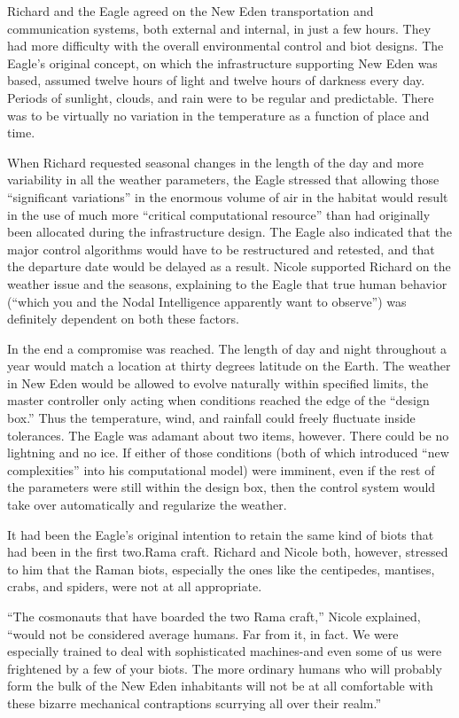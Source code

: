 \documentclass[]{article}
\begin{document}
{Richard and the Eagle agreed on the New Eden transportation and communication systems, both external and internal, in just a few hours. They had more difficulty with the overall environmental control and biot designs. The Eagle’s original concept, on which the infrastructure supporting New Eden was based, assumed twelve hours of light and twelve hours of darkness every day. Periods of sunlight, clouds, and rain were to be regular and predictable. There was to be virtually no variation in the temperature as a function of place and time.

When Richard requested seasonal changes in the length of the day and more variability in all the weather parameters, the Eagle stressed that allowing those “significant variations” in the enormous volume of air in the habitat would result in the use of much more “critical computational resource” than had originally been allocated during the infrastructure design. The Eagle also indicated that the major control algorithms would have to be restructured and retested, and that the departure date would be delayed as a result. Nicole supported Richard on the weather issue and the seasons, explaining to the Eagle that true human behavior (“which you and the Nodal Intelligence apparently want to observe”) was definitely dependent on both these factors.

In the end a compromise was reached. The length of day and night throughout a year would match a location at thirty degrees latitude on the Earth. The weather in New Eden would be allowed to evolve naturally within specified limits, the master controller only acting when conditions reached the edge of the “design box.” Thus the temperature, wind, and rainfall could freely fluctuate inside tolerances. The Eagle was adamant about two items, however. There could be no lightning and no ice. If either of those conditions (both of which introduced “new complexities” into his computational model) were imminent, even if the rest of the parameters were still within the design box, then the control system would take over automatically and regularize the weather.

It had been the Eagle’s original intention to retain the same kind of biots that had been in the first two.Rama craft. Richard and Nicole both, however, stressed to him that the Raman biots, especially the ones like the centipedes, mantises, crabs, and spiders, were not at all appropriate.

“The cosmonauts that have boarded the two Rama craft,” Nicole explained, “would not be considered average humans. Far from it, in fact. We were especially trained to deal with sophisticated machines-and even some of us were frightened by a few of your biots. The more ordinary humans who will probably form the bulk of the New Eden inhabitants will not be at all comfortable with these bizarre mechanical contraptions scurrying all over their realm.”

}
\end{document}
